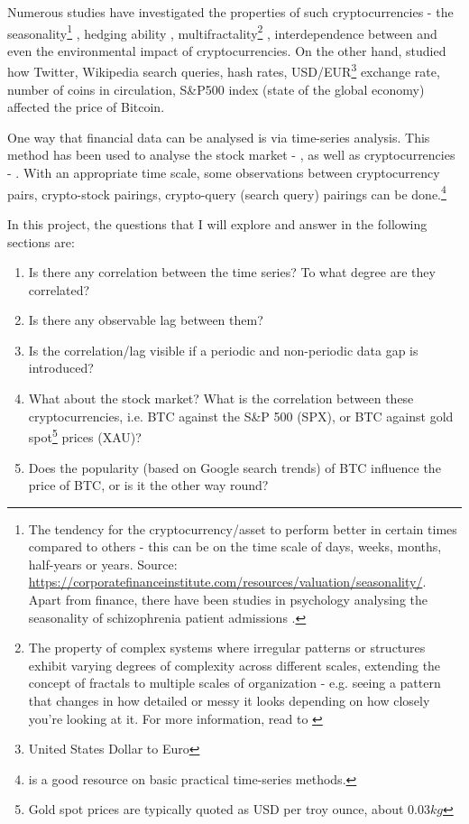 \documentclass[a4paper, 10pt, conference]{ieeeconf}      %
\begin{document}
Numerous studies have investigated the properties of such cryptocurrencies - the seasonality\footnote{The tendency for the cryptocurrency/asset to perform better in certain times compared to others - this can be on the time scale of days, weeks, months, half-years or years. Source: \url{https://corporatefinanceinstitute.com/resources/valuation/seasonality/}. Apart from finance, there have been studies in psychology analysing the seasonality of schizophrenia patient admissions \cite{Yao2023}.} \cite{Kaiser2019}, hedging ability \cite{Chan2019}, multifractality\footnote{The property of complex systems where irregular patterns or structures exhibit varying degrees of complexity across different scales, extending the concept of fractals to multiple scales of organization - e.g. seeing a pattern that changes in how detailed or messy it looks depending on how closely you're looking at it. For more information, read to \cite{Harte2001}} \cite{Takaishi2018}, interdependence between \cite{Qureshi2020} and even the environmental impact \cite{Wendl2023, Mohsin2021, Corbet2020} of cryptocurrencies. On the other hand, \cite{Georgoula2015} studied how Twitter, Wikipedia search queries, hash rates, USD/EUR\footnote{United States Dollar to Euro} exchange rate, number of coins in circulation, S\&P500 index (state of the global economy) affected the price of Bitcoin.

One way that financial data can be analysed is via time-series analysis. This method has been used to analyse the stock market - \cite{cao1992nonlinear, naik2013does, parray2020time}, as well as cryptocurrencies - \cite{Georgoula2015, Catania2017, Hagemann2018, Maleki2023, Vaz2020, Toyoda2018}. With an appropriate time scale, some observations between cryptocurrency pairs, crypto-stock pairings, crypto-query (search query) pairings can be done.\footnote{\cite{Pal2017} is a good resource on basic practical time-series methods.}

In this project, the questions that I will explore and answer in the following sections are:
\begin{enumerate}
    \item Is there any correlation between the time series? To what degree are they correlated? %
    \item Is there any observable lag between them? %
    \item Is the correlation/lag visible if a periodic and non-periodic data gap is introduced? %
    \item What about the stock market? What is the correlation between these cryptocurrencies, i.e. BTC against the S\&P 500 (SPX), or BTC against gold spot\footnote{Gold spot prices are typically quoted as USD per troy ounce, about $0.03kg$} prices (XAU)?
    \item Does the popularity (based on Google search trends) of BTC influence the price of BTC, or is it the other way round?
\end{enumerate}
\end{document}
